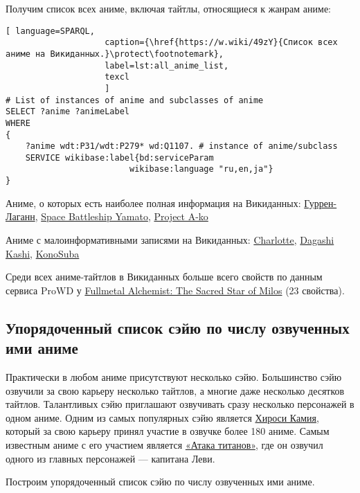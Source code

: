 Получим список всех аниме, включая тайтлы, относящиеся к жанрам аниме:

\begin{lstlisting}[ language=SPARQL, 
                    caption={\href{https://w.wiki/49zY}{Список всех аниме на Викиданных.}\protect\footnotemark},
                    label=lst:all_anime_list,
                    texcl 
                    ]
# List of instances of anime and subclasses of anime
SELECT ?anime ?animeLabel
WHERE
{
    ?anime wdt:P31/wdt:P279* wd:Q1107. # instance of anime/subclass
    SERVICE wikibase:label{bd:serviceParam
					     wikibase:language "ru,en,ja"}
}
\end{lstlisting}%

Аниме, о которых есть наиболее полная информация на Викиданных: \href{https://www.wikidata.org/wiki/Q4277}{Гуррен-Лаганн}, \href{https://www.wikidata.org/wiki/Q4292}{Space Battleship Yamato}, \href{https://www.wikidata.org/wiki/Q4316}{Project A-ko}

Аниме с малоинформативными записями на Викиданных: \href{https://www.wikidata.org/wiki/Q18692527}{Charlotte}, \href{https://www.wikidata.org/wiki/Q20043638}{Dagashi Kashi}, \href{https://www.wikidata.org/wiki/Q19750843}{KonoSuba}

Среди всех аниме-тайтлов в Викиданных больше всего свойств по данным сервиса ProWD у \href{https://www.wikidata.org/wiki/Q1004318}{Fullmetal Alchemist: The Sacred Star of Milos} (23 свойства).

\subsection{Упорядоченный список сэйю по числу озвученных ими аниме}

Практически в любом аниме присутствуют несколько сэйю. Большинство сэйю озвучили за свою карьеру несколько тайтлов, а многие даже несколько десятков тайтлов. Талантливых сэйю приглашают озвучивать сразу несколько персонажей в одном аниме. Одним из самых популярных сэйю является \href{https://clck.ru/YSCoP}{Хироси Камия}, который за свою карьеру принял участие в озвучке более 180 аниме. Самым известным аниме с его участием является \href{https://clck.ru/YSCrG}{«Атака титанов»}, где он озвучил одного из главных персонажей — капитана Леви.

Построим упорядоченный список сэйю по числу озвученных ими аниме. 

